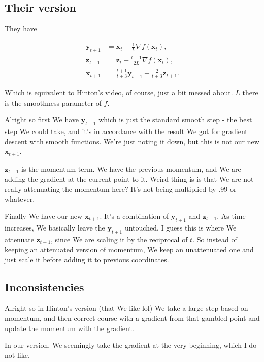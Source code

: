 \documentclass{article}
\begin{document}
	\subsection{Their version}
	
		They have
		
		\begin{align*}
			\mathbf{y}_{t+1} &= \mathbf{x}_t - \frac{1}{L}\nabla f(\mathbf{x}_t),\\
			\mathbf{z}_{t+1} &= \mathbf{z}_t - \frac{t+1}{2L}\nabla f(\mathbf{x}_t),\\
			\mathbf{x}_{t+1} &= \frac{t+1}{t+3}\mathbf{y}_{t+1} + \frac{2}{t+3}\mathbf{z}_{t+1}.
		\end{align*}

		Which is equivalent to Hinton's video, of course, just a bit messed about. $L$ there is  the smoothness parameter of $f$.
		
		Alright so first We have $\mathbf{y}_{t+1}$ which is just the standard smooth step - the best step We could take, and it's in accordance with the result We got for gradient descent with smooth functions. We're just noting it down, but this is not our new $\mathbf{x}_{t+1}$.
		
		$\mathbf{z}_{t+1}$ is the momentum term. We have the previous momentum, and We are adding the gradient at  the current point to it. Weird thing is is that We are not really attenuating the momentum here? It's not being multiplied by $.99$ or whatever. 
		
		Finally We have our new $\mathbf{x}_{t+1}$. It's a combination of $\mathbf{y}_{t+1}$ and $\mathbf{z}_{t+1}$. As time increases, We basically leave the $\mathbf{y}_{t+1}$ untouched. I guess this is where We attenuate $\mathbf{z}_{t+1}$, since We are scaling it by the reciprocal of $t$. So instead of keeping an attenuated version of momentum, We keep an unattenuated one and just scale it before adding it to previous coordinates. 
		
	\subsection{Inconsistencies}
	
		Alright so in Hinton's version (that We like lol) We take a large step based on momentum, and then correct course with a gradient from that gambled point and update the momentum with the gradient.
		
		In our version, We seemingly take the gradient at the very beginning, which I do not like.
		
\end{document}
